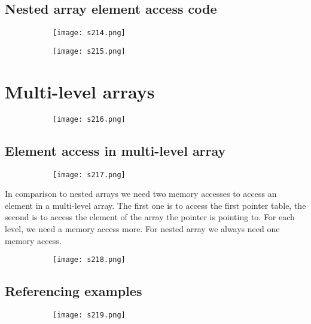 \documentclass[8pt]{extreport}
\begin{document}
\subsection{Nested array element access code}
\begin{figure}[H]
\centering
\begin{subfigure}[b]{0.4\linewidth}
\texttt{[image: s214.png]}
\end{subfigure}
\begin{subfigure}[b]{0.4\linewidth}
\texttt{[image: s215.png]}
\end{subfigure}
\end{figure}


\section{Multi-level arrays}
\begin{figure}[H]
\centering
\begin{subfigure}[b]{0.4\linewidth}
\texttt{[image: s216.png]}
\end{subfigure}
\end{figure}


\subsection{Element access in multi-level array}
\begin{figure}[H]
\centering
\begin{subfigure}[b]{0.4\linewidth}
\texttt{[image: s217.png]}
\end{subfigure}
\end{figure}
In comparison to nested arrays we need two memory accesses to access an element in a multi-level array. The first one is to access the first pointer table, the second is to access the element of the array the pointer is pointing to. For each level, we need a memory access more. For nested array we always need one memory access.
\begin{figure}[H]
\centering
\begin{subfigure}[b]{0.4\linewidth}
\texttt{[image: s218.png]}
\end{subfigure}
\end{figure}
\subsection{Referencing examples}
\begin{figure}[H]
\centering
\begin{subfigure}[b]{0.4\linewidth}
\texttt{[image: s219.png]}
\end{subfigure}
\end{figure}
\end{document}
